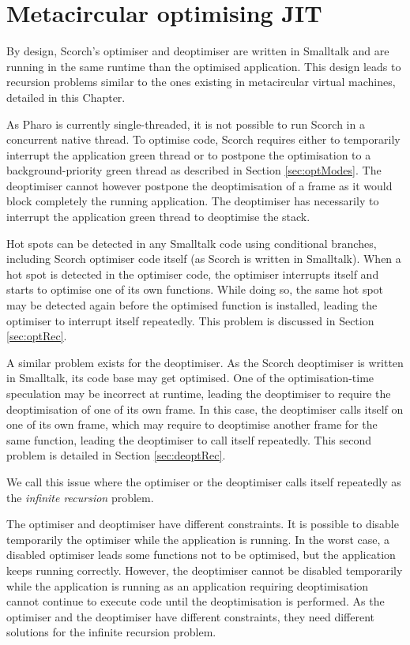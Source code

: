 \documentclass[a4paper,12pt,twoside]{../includes/ThesisStyle}
\begin{document}
\fi

\chapter{Metacircular optimising JIT}
\label{chap:metacircular}
\minitoc

By design, Scorch's optimiser and deoptimiser are written in Smalltalk and are running in the same runtime than the optimised application. This design leads to recursion problems similar to the ones existing in metacircular virtual machines, detailed in this Chapter. 

As Pharo is currently single-threaded, it is not possible to run Scorch in a concurrent native thread. To optimise code, Scorch requires either to temporarily interrupt the application green thread or to postpone the optimisation to a background-priority green thread as described in Section \ref{sec:optModes}. The deoptimiser cannot however postpone the deoptimisation of a frame as it would block completely the running application. The deoptimiser has necessarily to interrupt the application green thread to deoptimise the stack.

Hot spots can be detected in any Smalltalk code using conditional branches, including Scorch optimiser code itself (as Scorch is written in Smalltalk). When a hot spot is detected in the optimiser code, the optimiser interrupts itself and starts to optimise one of its own functions. While doing so, the same hot spot may be detected again before the optimised function is installed, leading the optimiser to interrupt itself repeatedly. This problem is discussed in Section \ref{sec:optRec}.

A similar problem exists for the deoptimiser. As the Scorch deoptimiser is written in Smalltalk, its code base may get optimised. One of the optimisation-time speculation may be incorrect at runtime, leading the deoptimiser to require the deoptimisation of one of its own frame. In this case, the deoptimiser calls itself on one of its own frame, which may require to deoptimise another frame for the same function, leading the deoptimiser to call itself repeatedly. This second problem is detailed in Section \ref{sec:deoptRec}.

We call this issue where the optimiser or the deoptimiser calls itself repeatedly as the \emph{infinite recursion} problem.

The optimiser and deoptimiser have different constraints. It is possible to disable temporarily the optimiser while the application is running. In the worst case, a disabled optimiser leads some functions not to be optimised, but the application keeps running correctly. However, the deoptimiser cannot be disabled temporarily while the application is running as an application requiring deoptimisation cannot continue to execute code until the deoptimisation is performed. As the optimiser and the deoptimiser have different constraints, they need different solutions for the infinite recursion problem.
\end{document}
